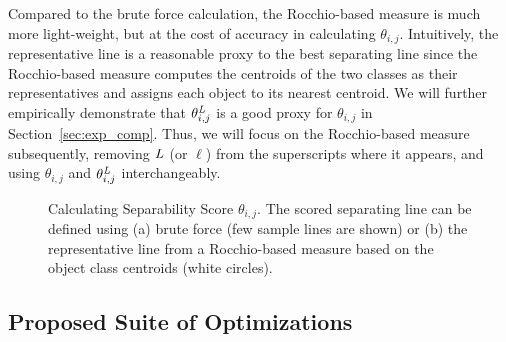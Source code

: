  Compared to the brute force calculation, the Rocchio-based measure is much more light-weight, but at the cost of accuracy in calculating $\theta_{i,j}$. Intuitively, the representative line is a reasonable proxy to the best separating line since the Rocchio-based measure computes the centroids of the two classes as their representatives and assigns each object to its nearest centroid. We will further empirically demonstrate that $\theta_{i,j}^{\mathit{L}}$ is a good proxy for $\theta_{i,j}$ in Section~\ref{sec:exp_comp}. Thus, we will focus on the Rocchio-based measure subsequently, removing $\mathit{L}$ (or $\ell$) from the superscripts where it appears, and using $\theta_{i,j}$ and $\theta_{i,j}^{\mathit{L}}$ interchangeably.


\begin{figure}[h]
\centering %
\vspace{-5mm}
\vspace{-5mm}
\caption{Calculating Separability Score $\theta_{i,j}$. The scored separating line can be defined using (a) brute force (few sample lines are shown) or (b) the representative line from a Rocchio-based measure based on the object class centroids (white circles).}
\vspace{-5mm}
\label{fig:metric}
\end{figure}
\subsection{Proposed Suite of Optimizations}\label{sec:opt}

